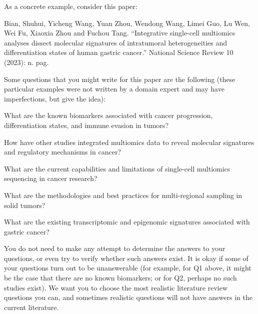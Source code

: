 \documentclass{article} %
\begin{document}
\begin{table}[h!]
\begin{tcolorbox}
As a concrete example, consider this paper:

\tcblower
Bian, Shuhui, Yicheng Wang, Yuan Zhou, Wendong Wang, Limei Guo, Lu Wen, Wei Fu, Xiaoxia Zhou and Fuchou Tang. ``Integrative single-cell multiomics analyses dissect molecular signatures of intratumoral heterogeneities and differentiation states of human gastric cancer.'' National Science Review 10 (2023): n. pag.

Some questions that you might write for this paper are the following (these particular examples were not written by a domain expert and may have imperfections, but give the idea):

What are the known biomarkers associated with cancer progression, differentiation states, and immune evasion in tumors? 

How have other studies integrated multiomics data to reveal molecular signatures and regulatory mechanisms in cancer?

What are the current capabilities and limitations of single-cell multiomics sequencing in cancer research?

What are the methodologies and best practices for multi-regional sampling in solid tumors?

What are the existing transcriptomic and epigenomic signatures associated with gastric cancer?

\tcblower
You do not need to make any attempt to determine the answers to your questions, or even try to verify whether such answers exist.  It is okay if some of your questions turn out to be unanswerable (for example, for Q1 above, it might be the case that there are no known biomarkers; or for Q2, perhaps no such studies exist).  We want you to choose the most realistic literature review questions you can, and sometimes realistic questions will not have answers in the current literature.
\end{tcolorbox}
\caption{\label{tab:annotator instructions_biomed} {\bf \textsc{ScholarQA-Bio}, \textsc{Neuro} annotation instructions}:Instructions given to our expert annotators for authoring questions in biomedicine. The example questions in this passage were composed with assistance from GPT. }
\end{table}
\end{document}
